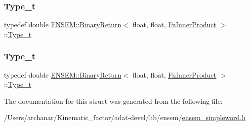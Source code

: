 \mbox{\label{structENSEM_1_1BinaryReturn_3_01float_00_01float_00_01FnInnerProduct_01_4_a9c257dea59acd1d92cfa3d929aa8ab4b}} 
\subsubsection{\texorpdfstring{Type\_t}{Type\_t}\hspace{0.1cm}{\footnotesize\ttfamily [2/3]}}
{\footnotesize\ttfamily typedef double \mbox{\hyperlink{structENSEM_1_1BinaryReturn}{E\+N\+S\+E\+M\+::\+Binary\+Return}}$<$ float, float, \mbox{\hyperlink{structENSEM_1_1FnInnerProduct}{Fn\+Inner\+Product}} $>$\+::\mbox{\hyperlink{structENSEM_1_1BinaryReturn_3_01float_00_01float_00_01FnInnerProduct_01_4_a9c257dea59acd1d92cfa3d929aa8ab4b}{Type\+\_\+t}}}

\mbox{\label{structENSEM_1_1BinaryReturn_3_01float_00_01float_00_01FnInnerProduct_01_4_a9c257dea59acd1d92cfa3d929aa8ab4b}} 
\subsubsection{\texorpdfstring{Type\_t}{Type\_t}\hspace{0.1cm}{\footnotesize\ttfamily [3/3]}}
{\footnotesize\ttfamily typedef double \mbox{\hyperlink{structENSEM_1_1BinaryReturn}{E\+N\+S\+E\+M\+::\+Binary\+Return}}$<$ float, float, \mbox{\hyperlink{structENSEM_1_1FnInnerProduct}{Fn\+Inner\+Product}} $>$\+::\mbox{\hyperlink{structENSEM_1_1BinaryReturn_3_01float_00_01float_00_01FnInnerProduct_01_4_a9c257dea59acd1d92cfa3d929aa8ab4b}{Type\+\_\+t}}}



The documentation for this struct was generated from the following file\+:\begin{DoxyCompactItemize}
\item 
/\+Users/archanar/\+Kinematic\+\_\+factor/adat-\/devel/lib/ensem/\mbox{\hyperlink{adat-devel_2lib_2ensem_2ensem__simpleword_8h}{ensem\+\_\+simpleword.\+h}}\end{DoxyCompactItemize}
